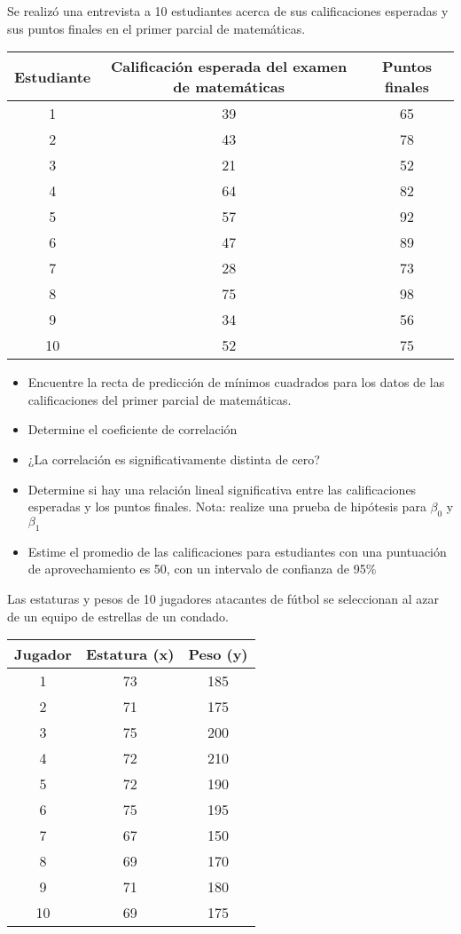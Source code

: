 \documentclass{../oxmathproblems}
\begin{document}
\begin{questions}


\miquestion Se realizó una entrevista a 10 estudiantes acerca de sus calificaciones  esperadas y sus puntos finales en el primer parcial de matemáticas. 

\begin{tabular}{|c|c|c|}
\hline
Estudiante & Calificación esperada del examen de matemáticas & Puntos finales \\ \hline
1 & 39 & 65\\
2 & 43 & 78\\
3 & 21  & 52\\ 
4& 64 & 82\\ 
5 & 57 & 92\\ 
6 & 47 & 89\\ 
7 & 28 & 73\\
8 & 75 & 98\\ 
9 & 34 & 56 \\ 
10 & 52 & 75\\ 
\hline
\end{tabular}

\begin{itemize}
  \item Encuentre la recta de predicción de mínimos cuadrados para los datos de las calificaciones del primer parcial de matemáticas.
  \item Determine el coeficiente de correlación
   \item  ¿La correlación es significativamente distinta de cero?
  \item Determine si hay una relación lineal significativa entre las calificaciones esperadas y los puntos finales. Nota: realize una prueba de hipótesis para $\beta_0$ y $\beta_1$ %
  \item Estime el promedio de las calificaciones para estudiantes con una  puntuación de aprovechamiento es 50, con un intervalo de confianza de 95\%
\end{itemize}
 
 
\miquestion Las estaturas y pesos de 10 jugadores atacantes de fútbol se seleccionan al azar de un equipo de estrellas de un condado. 


\begin{tabular}{|c|c|c|}
\hline
Jugador & Estatura (x) & Peso (y) \\ \hline
1 & 73 & 185\\
2 & 71& 175\\
3 & 75  & 200\\ 
4& 72 & 210\\ 
5 & 72 & 190\\ 
6 & 75 & 195\\ 
7 & 67 & 150\\
8 & 69 & 170\\ 
9 & 71 &180 \\ 
10 & 69 & 175\\ 
\hline
\end{tabular}


\end{questions}
\end{document}
